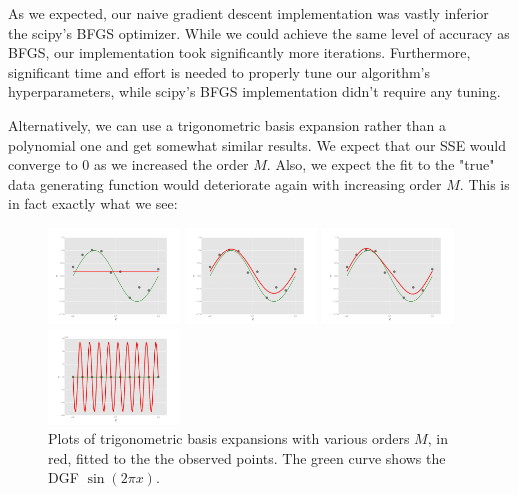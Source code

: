 \documentclass[10pt]{article}
\begin{document}
As we expected, our naive gradient descent implementation was vastly inferior the scipy's BFGS optimizer. While we could achieve the same level of accuracy as BFGS, our implementation took significantly more iterations. Furthermore, significant time and effort is needed to properly tune our algorithm's hyperparameters, while scipy's BFGS implementation didn't require any tuning. 

Alternatively, we can use a trigonometric basis expansion rather than a polynomial one and get somewhat similar results. We expect that our SSE would converge to 0 as we increased the order $M$. Also, we expect the fit to the "true" data generating function would deteriorate again with increasing order $M$. This is in fact exactly what we see: 

\begin{figure}[ht]
	\centering
	\begin{minipage}[b]{.24\linewidth}
		\includegraphics[width=1\linewidth, height=1in]{Meq0T.png}
		\caption*{$M=0$}
	\end{minipage}
	\begin{minipage}[b]{.24\linewidth}
		\includegraphics[width=1\linewidth, height=1in]{Meq1T.png}
		\caption*{$M=1$}
	\end{minipage}
	\begin{minipage}[b]{.24\linewidth}
		\includegraphics[width=1\linewidth, height=1in]{Meq3T.png}
		\caption*{$M=3$}
	\end{minipage}
	\begin{minipage}[b]{.24\linewidth}
		\includegraphics[width=1\linewidth, height=1in]{Meq9T.png}
		\caption*{$M=9$}
	\end{minipage}
	\caption{Plots of trigonometric basis expansions with various orders $M$, in red, fitted to the the observed points. The green curve shows the DGF $\sin(2\pi x)$.}
\end{figure}
\end{document}
